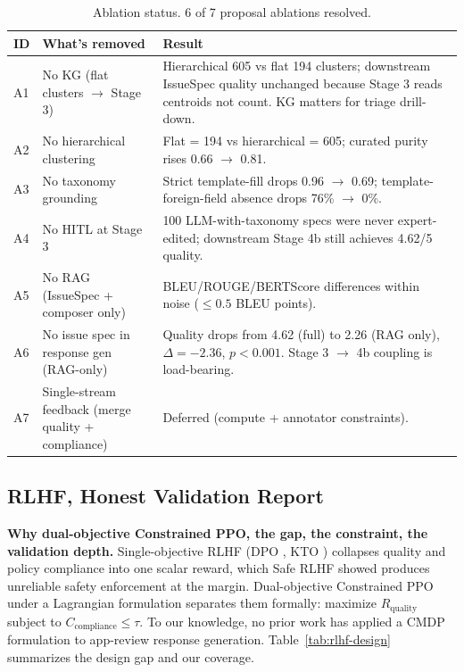 \documentclass[sigconf, nonacm, anonymous, balance=false]{acmart}
\begin{document}
\begin{table}[t]\centering\footnotesize\setlength{\tabcolsep}{4pt}
\caption{Ablation status. 6 of 7 proposal ablations resolved.}\label{tab:ablations}
\begin{tabular}{llp{8.5cm}}\toprule
ID & What's removed & Result \\\midrule
A1 & No KG (flat clusters $\to$ Stage 3) & Hierarchical 605 vs flat 194 clusters; downstream IssueSpec quality unchanged because Stage 3 reads centroids not count. KG matters for triage drill-down. \\
A2 & No hierarchical clustering & Flat = 194 vs hierarchical = 605; curated purity rises 0.66 $\to$ 0.81. \\
A3 & No taxonomy grounding & Strict template-fill drops 0.96 $\to$ 0.69; template-foreign-field absence drops 76\% $\to$ 0\%. \\
A4 & No HITL at Stage 3 & 100 LLM-with-taxonomy specs were never expert-edited; downstream Stage 4b still achieves 4.62/5 quality. \\
A5 & No RAG (IssueSpec + composer only) & BLEU/ROUGE/BERTScore differences within noise ($\leq 0.5$ BLEU points). \\
A6 & No issue spec in response gen (RAG-only) & Quality drops from 4.62 (full) to 2.26 (RAG only), $\Delta = -2.36$, $p < 0.001$. Stage 3 $\to$ 4b coupling is load-bearing. \\
A7 & Single-stream feedback (merge quality + compliance) & Deferred (compute + annotator constraints). \\\bottomrule
\end{tabular}\end{table}

\subsection{RLHF, Honest Validation Report}\label{rlhf-honest-validation-report}

\textbf{Why dual-objective Constrained PPO, the gap, the constraint, the validation depth.} Single-objective RLHF (DPO \cite{rafailov2023}, KTO \cite{ethayarajh2024}) collapses quality and policy compliance into one scalar reward, which Safe RLHF \cite{dai2023} showed produces unreliable safety enforcement at the margin. Dual-objective Constrained PPO under a Lagrangian formulation \cite{altman1999, dai2023} separates them formally: maximize $R_\text{quality}$ subject to $C_\text{compliance}\le\tau$. To our knowledge, no prior work has applied a CMDP formulation to app-review response generation. Table~\ref{tab:rlhf-design} summarizes the design gap and our coverage.
\end{document}
